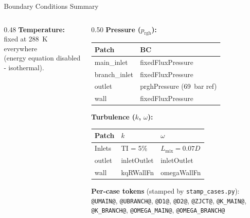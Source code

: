 \documentclass[10pt, aspectratio=169]{beamer}
\begin{document}
\begin{frame}{Boundary Conditions Summary}
\begin{columns}[T]
\begin{column}{0.48\textwidth}
            \vspace{0.2em}
            \textbf{Temperature:} fixed at 288~K everywhere\\
            (energy equation disabled - isothermal).
        \end{column}
        \begin{column}{0.50\textwidth}
            \textbf{Pressure ($p_{\mathrm{rgh}}$):}
            \begin{table}
                \centering\scriptsize
                \begin{tabular}{@{}ll@{}}
                    \toprule
                    \textbf{Patch} & \textbf{BC} \\
                    \midrule
                    main\_inlet & fixedFluxPressure \\
                    branch\_inlet & fixedFluxPressure \\
                    outlet & prghPressure (69~bar ref) \\
                    wall & fixedFluxPressure \\
                    \bottomrule
                \end{tabular}
            \end{table}

            \vspace{0.2em}
            \textbf{Turbulence ($k$, $\omega$):}
            \begin{table}
                \centering\scriptsize
                \begin{tabular}{@{}lll@{}}
                    \toprule
                    \textbf{Patch} & $k$ & $\omega$ \\
                    \midrule
                    Inlets & TI = 5\% & $L_{\mathrm{mix}} = 0.07D$ \\
                    outlet & inletOutlet & inletOutlet \\
                    wall & kqRWallFn & omegaWallFn \\
                    \bottomrule
                \end{tabular}
            \end{table}

            \vspace{0.2em}
            \textbf{Per-case tokens} (stamped by \texttt{stamp\_cases.py}):\\[2pt]
            {\scriptsize
            \texttt{@UMAIN@}, \texttt{@UBRANCH@}, \texttt{@D1@},
            \texttt{@D2@}, \texttt{@ZJCT@}, \texttt{@K\_MAIN@},
            \texttt{@K\_BRANCH@}, \texttt{@OMEGA\_MAIN@},
            \texttt{@OMEGA\_BRANCH@}}
        \end{column}
    \end{columns}
\end{frame}
\end{document}
